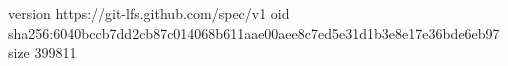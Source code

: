 version https://git-lfs.github.com/spec/v1
oid sha256:6040bccb7dd2cb87c014068b611aae00aee8c7ed5e31d1b3e8e17e36bde6eb97
size 399811
